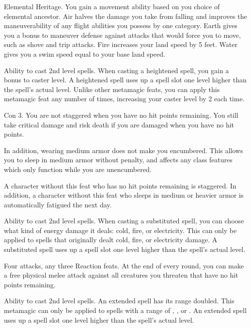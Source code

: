 \featpre Elemental Heritage.
\featben You gain a movement ability based on you choice of elemental ancestor.
Air halves the damage you take from falling and improves the maneuverability of any flight abilities you possess by one category.
Earth gives you a  bonus to maneuver defense against attacks that would force you to move, such as shove and trip attacks.
Fire increases your land speed by 5 feet.
Water gives you a swim speed equal to your base land speed.

\featpre Ability to cast 2nd level spells.
\featben When casting a heightened spell, you gain a  bonus to caster level.
A heightened spell uses up a spell slot one level higher than the spell's actual level.
Unlike other metamagic feats, you can apply this metamagic feat any number of times, increasing your caster level by 2 each time.

\featpre Con 3.
\featben You are not staggered when you have no hit points remaining.
You still take critical damage and risk death if you are damaged when you have no hit points.

In addition, wearing medium armor does not make you encumbered.
This allows you to sleep in medium armor without penalty, and affects any class features which only function while you are unencumbered.

A character without this feat who has no hit points remaining is staggered.
In addition, a character without this feat who sleeps in medium or heavier armor is automatically fatigued the next day.

\featpre Ability to cast 2nd level spells.
\featben When casting a substituted spell, you can choose what kind of energy damage it deals: cold, fire, or electricity.
This can only be applied to spells that originally dealt cold, fire, or electricity damage.
A substituted spell uses up a spell slot one level higher than the spell's actual level.

\featpres
Four attacks, any three Reaction feats.
\featben At the end of every round, you can make a free physical melee attack against all creatures you threaten that have no hit points remaining.

\featpre Ability to cast 2nd level spells.
\featben An extended spell has its range doubled.
This metamagic can only be applied to spells with a range of \rngclose, \rngmed, or \rnglong.
An extended spell uses up a spell slot one level higher than the spell's actual level.


